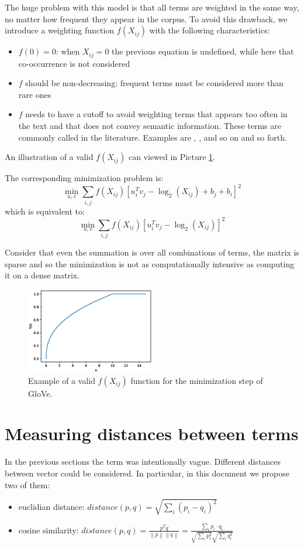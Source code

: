 The huge problem with this model is that all terms are weighted in the same way,
no matter how frequent they appear in the corpus.
To avoid this drawback, we introduce a weighting function $f(X_{ij})$ with the following characteristics:
\begin{itemize}
    \item $f(0) = 0$: when $X_{ij} = 0$ the previous equation is undefined, while here that co-occurrence is not considered
    \item $f$ should be non-decreasing: frequent terms must be considered more than rare ones
    \item $f$ needs to have a cutoff to avoid weighting terms that appears too often in the text and that does not convey semantic information.
          These terms are commonly called  in the literature. Examples are , ,  and so on and so forth.
\end{itemize}
An illustration of a valid $f(X_{ij})$ can viewed in Picture \ref{fig:glovef}.

The corresponding minimization problem is:
$$ \min_{u,v} \sum_{i,j} f(X_{ij}) [u_i^T v_j - \log_2(X_{ij}) + b_j + b_i]^2 $$
which is equivalent to:
$$ \min_{u,v} \sum_{i,j} f(X_{ij}) [u_i^T v_j - \log_2(X_{ij})]^2 $$

Consider that even the summation is over all combinations of terms,
the matrix is sparse and so the minimization is not as computationally intensive
as computing it on a dense matrix.

\begin{figure}[h]
    \centering
    \includegraphics[width=0.5\textwidth]{images/glovef}
    \caption{Example of a valid $f(X_{ij})$ function for the minimization step of GloVe.}
    \label{fig:glovef}
\end{figure}

\section{Measuring distances between terms}
In the previous sections the term  was intentionally vague.
Different distances between vector could be considered.
In particular, in this document we propose two of them:
\begin{itemize}
    \item euclidian distance: $distance(p, q) = \sqrt{\sum_i (p_i - q_i)^2}$
    \item cosine similarity: $distance(p, q) = \frac{p^T q}{\left\lVert p \right\rVert \left\lVert q \right\rVert} = \frac{\sum_i p_i \cdot q_i}{\sqrt{\sum_i p_i^2} \sqrt{\sum_i q_i^2}}$
\end{itemize}

